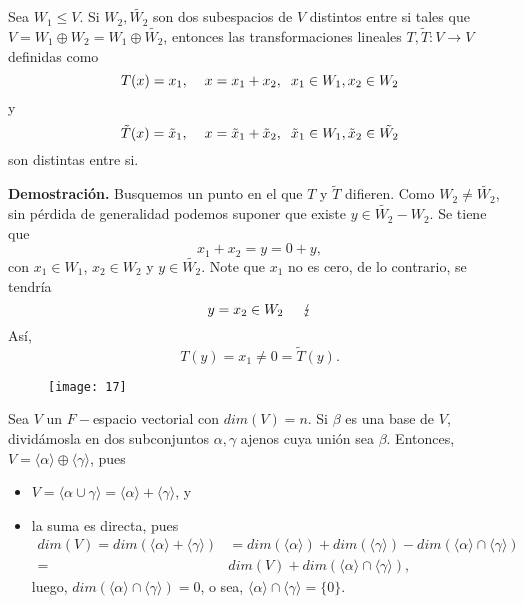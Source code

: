 \begin{prop}
Sea $W_{1} \leq V$. Si $W_{2}, \tilde{W_{2}}$ son dos
subespacios de $V$ distintos entre si tales que
$V = W_{1} \oplus W_{2} = W_{1} \oplus \tilde{W_{2}}$, entonces
las transformaciones lineales
$T, \tilde{T}: V \longrightarrow V$ definidas como
\[
T(x) = x_{1}, \hspace{0.4cm}
x = x_{1} + x_{2}, \hspace{0.2cm}
x_{1} \in W_{1}, x_{2} \in W_{2}
\]
y 
\[
\tilde{T}(x) = \tilde{x}_{1}, \hspace{0.4cm}
x = \tilde{x}_{1} + 
\tilde{x}_{2}, \hspace{0.2cm}
\tilde{x}_{1} \in W_{1}, 
\tilde{x}_{2} \in \tilde{W_{2}}
\]
son distintas entre si.
\end{prop}
\noindent
\textbf{Demostración.}
Busquemos un punto en el que $T$
y $\tilde{T}$ difieren. Como 
$W_{2} \neq \tilde{W_{2}}$, sin pérdida de generalidad
podemos suponer que existe $y \in \tilde{W_{2}}-W_{2}$.
Se tiene que 
\[
x_{1} + x_{2} = y = 0 + y,
\]
con $x_{1} \in W_{1}$, $x_{2} \in W_{2}$
y $y \in \tilde{W_{2}}$. Note que $x_{1}$ no es
cero, de lo contrario, se tendría
\[
y = x_{2} \in W_{2} \hspace{0.5cm}
\lightning
\]
Así, 
\[
T(y) = x_{1} \neq 0 = \tilde{T}(y).
\]
\QEDB
\vspace{0.2cm}


\begin{figure}[H]
		\texttt{[image: 17]} 
 \end{figure}

\begin{ejem}
Sea $V$ un $F-$espacio vectorial con $dim(V) = n$.
Si $\beta$ es una base de $V$, dividámosla en dos subconjuntos
$\alpha, \gamma$
ajenos cuya unión sea $\beta$. Entonces, $V = 
\langle \alpha \rangle \oplus \langle \gamma \rangle $,
pues 
\begin{itemize}
	\item $V = \langle \alpha \cup \gamma \rangle = 
	\langle \alpha \rangle + \langle \gamma \rangle$,
	y
	\item la suma es directa, pues
	\begin{align*}
	dim(V) = dim(\langle \alpha \rangle + \langle \gamma \rangle) &
	= dim(\langle \alpha \rangle) + 
	dim(\langle \gamma \rangle) - 
	dim(\langle \alpha \rangle \cap \langle \gamma \rangle) \\
	= & dim(V) + 
	dim(\langle \alpha \rangle \cap \langle \gamma \rangle),
	\end{align*}
	luego, $dim(\langle \alpha \rangle \cap \langle \gamma \rangle)
	= 0$, o sea, $\langle \alpha \rangle \cap \langle \gamma \rangle =
	\{ 0 \}$.
\end{itemize}
\end{ejem}
